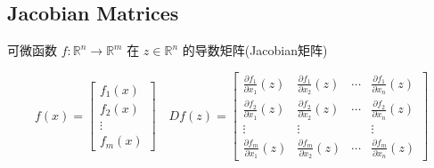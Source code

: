 \subsection{Jacobian Matrices}


\begin{definition}
    可微函数 $ f: \mathbb{R}^{n} \rightarrow \mathbb{R}^{m} $ 在 $ z \in \mathbb{R}^{n} $ 的导数矩阵(Jacobian矩阵)

\begin{equation}
f(x)=\left[\begin{array}{c}
f_{1}(x) \\
f_{2}(x) \\
\vdots \\
f_{m}(x)
\end{array}\right] \quad D f(z)=\left[\begin{array}{cccc}
\frac{\partial f_{1}}{\partial x_{1}}(z) & \frac{\partial f_{1}}{\partial x_{2}}(z) & \cdots & \frac{\partial f_{1}}{\partial x_{n}}(z) \\
\frac{\partial f_{2}}{\partial x_{1}}(z) & \frac{\partial f_{2}}{\partial x_{2}}(z) & \cdots & \frac{\partial f_{2}}{\partial x_{n}}(z) \\
\vdots & \vdots & & \vdots \\
\frac{\partial f_{m}}{\partial x_{1}}(z) & \frac{\partial f_{m}}{\partial x_{2}}(z) & \cdots & \frac{\partial f_{m}}{\partial x_{n}}(z)
\end{array}\right]
\end{equation}
\end{definition}

